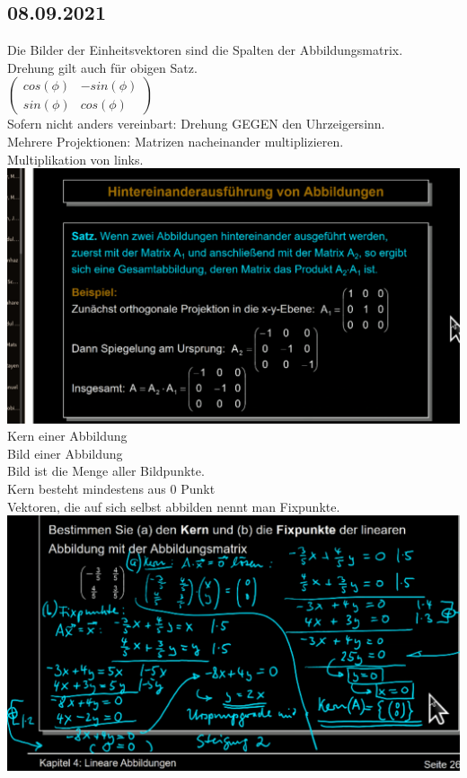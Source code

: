 \documentclass{article}
\begin{document}
	\subsection*{08.09.2021}
	Die Bilder der Einheitsvektoren sind die Spalten der Abbildungsmatrix. \\
	Drehung gilt auch für obigen Satz. \\
	$\left(\begin{array}{cc}
	cos(\phi) & -sin(\phi) \\ sin(\phi) & cos(\phi)
	\end{array}\right)$ \\
	Sofern nicht anders vereinbart: Drehung GEGEN den Uhrzeigersinn. \\
	Mehrere Projektionen: Matrizen nacheinander multiplizieren. \\
	Multiplikation von links. \\
	\includegraphics[width=\linewidth]{abbildung} \\
	Kern einer Abbildung \\
	Bild einer Abbildung \\
	Bild ist die Menge aller Bildpunkte. \\
	Kern besteht mindestens aus 0 Punkt \\
	Vektoren, die auf sich selbst abbilden nennt man Fixpunkte. \\
	\includegraphics[width=\linewidth]{sampleFixKern}
\end{document}
